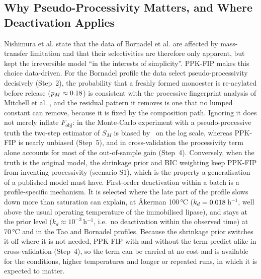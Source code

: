 \subsection{Why Pseudo-Processivity Matters, and Where Deactivation Applies}
Nishimura et al. state that the data of Bornadel et al. are affected by mass-transfer limitation and that their selectivities are therefore only apparent, but kept the irreversible model ``in the interests of simplicity''. PPK-FIP makes this choice data-driven. For the Bornadel profile the data select pseudo-processivity decisively (Step~2), the probability that a freshly formed monoester is re-acylated before release ($p_M\approx0.18$) is consistent with the processive fingerprint analysis of Mitchell et al. \cite{mitchell2023}, and the residual pattern it removes is one that no lumped constant can remove, because it is fixed by the composition path. Ignoring it does not merely inflate $F_\mathrm{obj}$: in the Monte-Carlo experiment with a pseudo-processive truth the two-step estimator of $S_M$ is biased by \SimSMBiasOrig\ on the log scale, whereas PPK-FIP is nearly unbiased (Step~5), and in cross-validation the processivity term alone accounts for most of the out-of-sample gain (Step~4). Conversely, when the truth is the original model, the shrinkage prior and BIC weighting keep PPK-FIP from inventing processivity (scenario S1), which is the property a generalisation of a published model must have. First-order deactivation within a batch is a profile-specific mechanism. It is selected where the late part of the profile slows down more than saturation can explain, at Åkerman 100\,°C ($k_d=0.018$\,h$^{-1}$, well above the usual operating temperature of the immobilised lipase), and stays at the prior level ($k_d\approx10^{-3}$\,h$^{-1}$, i.e.\ no deactivation within the observed time) at 70\,°C and in the Tao and Bornadel profiles. Because the shrinkage prior switches it off where it is not needed, PPK-FIP with and without the term predict alike in cross-validation (Step~4), so the term can be carried at no cost and is available for the conditions, higher temperatures and longer or repeated runs, in which it is expected to matter.

